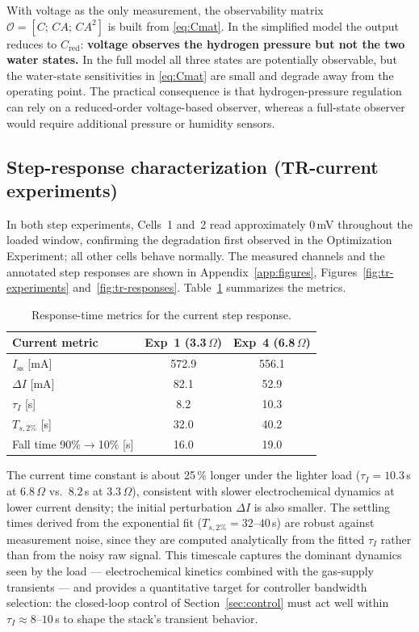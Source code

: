 \documentclass[11pt,a4paper]{article}
\begin{document}
With voltage as the only measurement, the observability matrix
$\mathcal{O}=[C;\,CA;\,CA^2]$ is built from \eqref{eq:Cmat}. In the simplified
model the output reduces to $C_{\text{red}}$:
\textbf{voltage observes the hydrogen pressure but not the two water states.}
In the full model all three states are potentially observable, but the
water-state sensitivities in \eqref{eq:Cmat} are small and degrade away from the
operating point. The practical consequence is that hydrogen-pressure regulation
can rely on a reduced-order voltage-based observer, whereas a full-state observer
would require additional pressure or humidity sensors.

\subsection{Step-response characterization (TR-current experiments)}
\label{sec:results-tr}

In both step experiments, Cells~1 and~2 read approximately 0\,mV throughout the
loaded window, confirming the degradation first observed in the Optimization
Experiment; all other cells behave normally. The measured channels and the
annotated step responses are shown in Appendix~\ref{app:figures},
Figures~\ref{fig:tr-experiments} and~\ref{fig:tr-responses}.
Table~\ref{tab:response-rt} summarizes the metrics.

\begin{table}[H]
    \centering
    \caption{Response-time metrics for the current step response.}
    \label{tab:response-rt}
    \small
    \begin{tabular}{lcc}
        \toprule
        \textbf{Current metric} & \textbf{Exp~1 (3.3\,$\Omega$)} & \textbf{Exp~4 (6.8\,$\Omega$)} \\
        \midrule
        $I_{\text{ss}}$ [mA]            & 572.9 & 556.1 \\
        $\Delta I$ [mA]                 &  82.1 &  52.9 \\
        $\tau_I$ [s]                    &   8.2 &  10.3 \\
        $T_{s,2\%}$ [s]                 &  32.0 &  40.2 \\
        Fall time 90\%$\to$10\% [s]     &  16.0 &  19.0 \\
        \bottomrule
    \end{tabular}
\end{table}

The current time constant is about 25\,\% longer under the lighter load
($\tau_I=10.3$\,s at $6.8\,\Omega$ vs.\ $8.2$\,s at $3.3\,\Omega$), consistent
with slower electrochemical dynamics at lower current density; the initial
perturbation $\Delta I$ is also smaller. The settling times derived from the
exponential fit ($T_{s,2\%}=32$--$40$\,s) are robust against measurement noise,
since they are computed analytically from the fitted $\tau_I$ rather than from
the noisy raw signal. This timescale captures the dominant dynamics seen by the
load --- electrochemical kinetics combined with the gas-supply transients --- and
provides a quantitative target for controller bandwidth selection: the
closed-loop control of Section~\ref{sec:control} must act well within
$\tau_I \approx 8$--$10$\,s to shape the stack's transient behavior.
\end{document}
